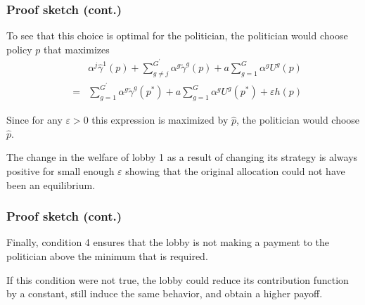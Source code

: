 \documentclass[11pt,aspectratio=169]{beamer}
\begin{document}
\begin{frame}
\frametitle{Proof sketch (cont.)}

To see that this choice is optimal for the politician, the politician would choose policy $p$ that maximizes
\begin{eqnarray*}
&&\alpha^{j}\hat{\gamma}^{1}\left( p\right) +\sum_{g\neq j}^{G^{\prime
}}\alpha ^{g}\tilde{\gamma}^{g}\left( p\right) +a\sum_{g=1}^{G}\alpha
^{g}U^{g}\left( p\right) \\
&=&\sum_{g=1}^{G^{\prime }}\alpha ^{g}\tilde{\gamma}^{g}\left( p^{\ast
}\right) +a\sum_{g=1}^{G}\alpha ^{g}U^{g}\left( p^{\ast }\right)
+\varepsilon h( p)
\end{eqnarray*}

Since for any $\varepsilon >0$ this expression is maximized by $\hat{p}$, the politician would choose $\hat{p}$.

The change in the welfare of lobby 1 as a result of changing its strategy is always positive for small enough $\varepsilon $ showing that the original  allocation could not have been an equilibrium.

\end{frame}


\begin{frame}

\frametitle{Proof sketch (cont.)}

Finally, condition 4 ensures that the lobby is not making a payment to the politician above the minimum that is required.

If this condition were not true, the lobby could reduce its contribution function by a constant, still induce the same behavior, and obtain a higher payoff.

\end{frame}
\end{document}
